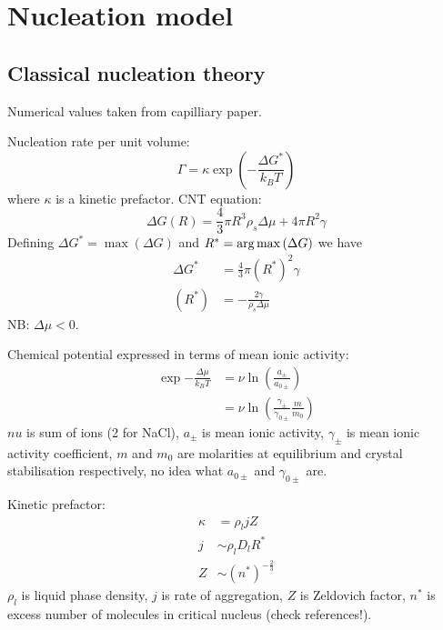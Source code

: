 \documentclass[12pt,twoside]{report}
\begin{document}

\section{Nucleation model}
\subsection{Classical nucleation theory}

Numerical values taken from capilliary paper.

Nucleation rate per unit volume:
\begin{equation}
  \Gamma = \kappa \exp{\left(-\frac{\Delta G^{*}}{k_B T}\right)}
\end{equation}
where $\kappa$ is a kinetic prefactor.
CNT equation:
\begin{equation}
  \Delta G(R) = \frac{4}{3} \pi R^3 \rho_s \Delta \mu + 4\pi R^2 \gamma
\end{equation}
Defining $\Delta G^{*} = \max{(\Delta G)}$ and $R^{*} = \operatorname*{arg\,max}{(\Delta G)}$ we have
\begin{align}
  \Delta G^{*} &= \frac{4}{3} \pi (R^{*})^2 \gamma \\
  (R^{*}) &= -\frac{2\gamma}{\rho_s \Delta\mu}
\end{align}
NB: $\Delta \mu < 0$.

Chemical potential expressed in terms of mean ionic activity:
\begin{equation}
  \begin{aligned}
  \exp{-\frac{\Delta \mu}{k_B T}} &=
  \nu \ln{\left( \frac{a_\pm}{a_{0\pm}} \right)} \\
  &=
  \nu \ln{\left( \frac{\gamma_\pm}{\gamma_{0\pm}} \frac{m}{m_0} \right)}
  \end{aligned}
\end{equation}
$nu$ is sum of ions (2 for NaCl), $a_\pm$ is mean ionic activity, $\gamma_\pm$ is mean ionic activity coefficient, $m$ and $m_0$ are molarities at equilibrium and crystal stabilisation respectively, no idea what $a_{0\pm}$ and $\gamma_{0\pm}$ are.

Kinetic prefactor:
\begin{align}
  \kappa &= \rho_l j Z \\
  j &\sim \rho_l D_l R^* \\
  Z &\sim (n^*)^{-\tfrac{2}{3}}
\end{align}
$\rho_l$ is liquid phase density, $j$ is rate of aggregation, $Z$ is Zeldovich factor, $n^*$ is excess number of molecules in critical nucleus (check references!).
\end{document}
